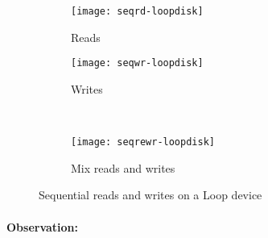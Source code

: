 \begin{figure}[!ht]
  \begin{subfigure}[b]{0.2\textwidth}
  \texttt{[image: seqrd-loopdisk]}
  \caption{Reads}
  \label{subfig:seqrd-loopdisk}
  \end{subfigure}
  \hspace{50mm}
  \begin{subfigure}[b]{0.2\textwidth}
  \texttt{[image: seqwr-loopdisk]}
  \caption{Writes}
  \label{subfig:seqwr-loopdisk}
  \end{subfigure}\\
  \begin{subfigure}[b]{0.3\textwidth}
  \texttt{[image: seqrewr-loopdisk]}
  \caption{Mix reads and writes}
  \label{subfig:seqrewr-loopdisk}
  \end{subfigure}
\caption{Sequential reads and writes on a Loop device}\label{fig:seqloopdisk}
\end{figure}


\paragraph{Observation:}





